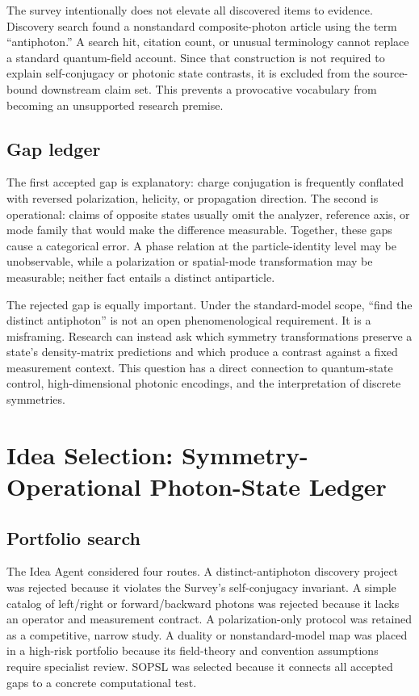 \documentclass[conference]{../../../../Conference-LaTeX-template_10-17-19/IEEEtran}
\begin{document}
The survey intentionally does not elevate all discovered items to evidence. Discovery search found a nonstandard composite-photon article using the term ``antiphoton.'' A search hit, citation count, or unusual terminology cannot replace a standard quantum-field account. Since that construction is not required to explain self-conjugacy or photonic state contrasts, it is excluded from the source-bound downstream claim set. This prevents a provocative vocabulary from becoming an unsupported research premise.

\subsection{Gap ledger}
The first accepted gap is explanatory: charge conjugation is frequently conflated with reversed polarization, helicity, or propagation direction. The second is operational: claims of opposite states usually omit the analyzer, reference axis, or mode family that would make the difference measurable. Together, these gaps cause a categorical error. A phase relation at the particle-identity level may be unobservable, while a polarization or spatial-mode transformation may be measurable; neither fact entails a distinct antiparticle.

The rejected gap is equally important. Under the standard-model scope, ``find the distinct antiphoton'' is not an open phenomenological requirement. It is a misframing. Research can instead ask which symmetry transformations preserve a state’s density-matrix predictions and which produce a contrast against a fixed measurement context. This question has a direct connection to quantum-state control, high-dimensional photonic encodings, and the interpretation of discrete symmetries.

\section{Idea Selection: Symmetry-Operational Photon-State Ledger}
\subsection{Portfolio search}
The Idea Agent considered four routes. A distinct-antiphoton discovery project was rejected because it violates the Survey’s self-conjugacy invariant. A simple catalog of left/right or forward/backward photons was rejected because it lacks an operator and measurement contract. A polarization-only protocol was retained as a competitive, narrow study. A duality or nonstandard-model map was placed in a high-risk portfolio because its field-theory and convention assumptions require specialist review. SOPSL was selected because it connects all accepted gaps to a concrete computational test.
\end{document}
